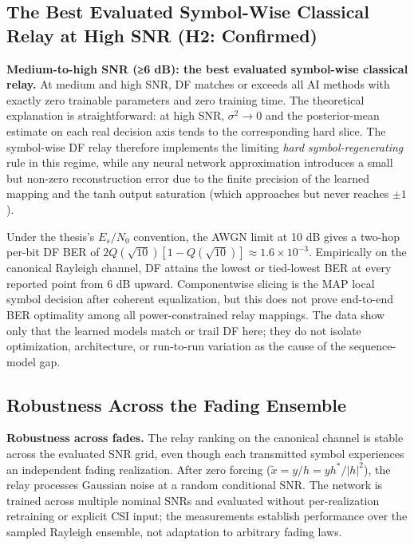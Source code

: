 \subsection{The Best Evaluated Symbol-Wise Classical Relay at High SNR (H2: Confirmed)}\label{sec:classical-dominance-at-high-snr-h2-confirmed}

\textbf{Medium-to-high SNR (≥6 dB): the best evaluated symbol-wise classical relay.} At medium and high SNR, DF matches or exceeds all AI methods with exactly zero trainable parameters and zero training time. The theoretical explanation is straightforward: at high SNR, \(\sigma^2 \to 0\) and the posterior-mean estimate on each real decision axis tends to the corresponding hard slice. The symbol-wise DF relay therefore implements the limiting \emph{hard symbol-regenerating} rule in this regime, while any neural network approximation introduces a small but non-zero reconstruction error due to the finite precision of the learned mapping and the tanh output saturation (which approaches but never reaches \(\pm 1\)).

Under the thesis's \(E_s/N_0\) convention, the AWGN limit at 10 dB gives a two-hop per-bit DF BER of \(2Q(\sqrt{10})[1-Q(\sqrt{10})]\approx1.6\times10^{-3}\). Empirically on the canonical Rayleigh channel, DF attains the lowest or tied-lowest BER at every reported point from 6 dB upward. Componentwise slicing is the MAP local symbol decision after coherent equalization, but this does not prove end-to-end BER optimality among all power-constrained relay mappings. The data show only that the learned models match or trail DF here; they do not isolate optimization, architecture, or run-to-run variation as the cause of the sequence-model gap.

\subsection{Robustness Across the Fading Ensemble}\label{sec:channel-robustness}

\textbf{Robustness across fades.} The relay ranking on the canonical channel is stable across the evaluated SNR grid, even though each transmitted symbol experiences an independent fading realization. After zero forcing (\(\tilde{x}=y/h=yh^*/|h|^2\)), the relay processes Gaussian noise at a random conditional SNR. The network is trained across multiple nominal SNRs and evaluated without per-realization retraining or explicit CSI input; the measurements establish performance over the sampled Rayleigh ensemble, not adaptation to arbitrary fading laws.

